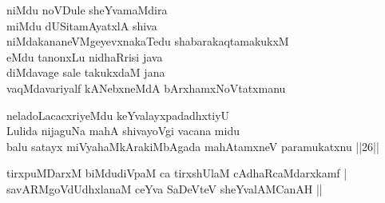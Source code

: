 \begin{entry}
\end{entry}

\begin{entry}
\gl{}
\begin{shl}
niMdu noVDule sheYvamaMdira\\
miMdu dUSitamAyatxlA shiva\\
niMdakananeVMgeyevxnakaTedu shabarakaqtamakukxM\\
eMdu tanonxLu nidhaRrisi java\\
diMdavage sale takukxdaM jana\\
vaqMdavariyalf kANebxneMdA bArxhamxNoVtatxmanu 
\end{shl}
\end{entry}

\begin{entry}
\gl{}
\end{entry}

\begin{entry}
\begin{shl}
neladoLacacxriyeMdu keYvalayxpadadhxtiyU\\
Lulida nijaguNa mahA shivayoVgi vacana midu\\
balu satayx miVyahaMkArakiMbAgada mahAtamxneV paramukatxnu ||26||
\end{shl}
\end{entry}

\begin{entry}
\begin{shl}
tirxpuMDarxM biMdudiVpaM ca tirxshUlaM cAdhaRcaMdarxkamf |\\
savARMgoVdUdhxlanaM ceYva SaDeVteV sheYvalAMCanAH || 
\end{shl}
\end{entry}

